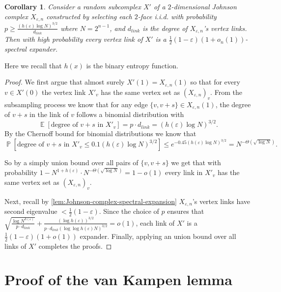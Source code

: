 \documentclass[10pt,a4paper]{article}
\newcommand{\prettyref}[1]{\cref{#1}}
\newtheorem{corollary}[theorem]{Corollary}
\theoremstyle{definition}
\theoremstyle{remark}
\newcommand{\Esymb}{\mathbb{E}}
\newcommand{\Psymb}{\mathbb{P}}
\DeclareMathOperator*{\E}{\Esymb}
\DeclareMathOperator*{\ProbOp}{\Psymb}
\renewcommand{\Pr}{\ProbOp}
\renewcommand{\le}{\leqslant}
\renewcommand{\ge}{\geqslant}
\numberwithin{equation}{section}
\let\pref=\prettyref
\begin{document}
\begin{corollary}
    Consider a random subcomplex $X'$ of a $2$-dimensional Johnson complex $X_{\varepsilon, n}$ constructed by selecting each $2$-face i.i.d. with probability $p \ge \frac{(h(\varepsilon)\log N)^{3/2}}{d_{link}}$ where $N =  2^{n-1}$, and $d_{link}$ is the degree of $X_{\varepsilon, n}$'s vertex links. Then with high probability every vertex link of $X'$ is a $\frac{1}{2}(1-\varepsilon)(1+o_n(1))$-spectral expander.
\end{corollary}
Here we recall that \(h(x)\) is the binary entropy function.
\begin{proof}
    We first argue that almost surely $X'(1) = X_{\varepsilon,n}(1)$ so that for every $v\in X'(0)$ the vertex link $X'_v$ has the same vertex set as $(X_{\varepsilon,n})_v$. From the subsampling process we know that for any edge $\{v,v+s\} \in X_{\varepsilon,n}(1)$, the degree of $v+s$ in the link of $v$ follows a binomial distribution with
    \[\E[\textrm{degree of } v+s \textrm{ in } X'_v] 
        = p \cdot d_{link} =(h(\varepsilon)\log N)^{3/2}.\]
    By the Chernoff bound for binomial distributions we know that 
    \[\Pr[\textrm{degree of } v+s \textrm{ in } X'_v \le 0.1 (h(\varepsilon)\log N)^{3/2} ] \le e^{-0.45(h(\varepsilon)\log N)^{3/2}} = N^{-\Theta(\sqrt{\log N})}.\]

    So by a simply union bound over all pairs of $\{v,v+s\}$ we get that with probability $1 - N^{1+h(\varepsilon)} \cdot N^{-\Theta(\sqrt{\log N})} = 1- o(1)$ every link in $X'_v$ has the same vertex set as $(X_{\varepsilon,n})_v$.

    Next, recall by \pref{lem:Johnson-complex-spectral-expansion} $X_{\varepsilon,n}$'s vertex links have second eigenvalue $<\frac{1}{2}(1-\varepsilon)$. Since the choice of $p$ ensures that $\sqrt{\frac{\log N^{h(\varepsilon)}}{p\cdot d_{link}}} + \frac{(\log h(\varepsilon))^{3/2}}{p\cdot d_{link} (\log\log h(\varepsilon)N)^{3/2}} = o(1)$, each link of $X'$ is a $\frac{1}{2}(1-\varepsilon)(1+o(1))$ expander. Finally, applying an union bound over all links of $X'$ completes the proofs.
\end{proof}



\section{Proof of the van Kampen lemma}
\label{app:van-kampen}

\end{document}
